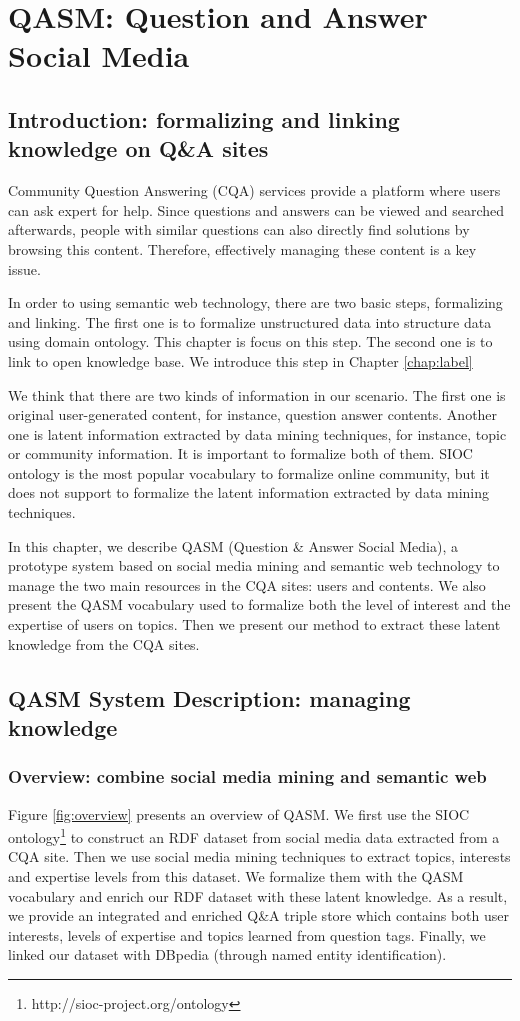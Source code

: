 \chapter{QASM: Question and Answer Social Media}
\doublespacing
\label{chap:qasm}
\minitoc

\section{Introduction: formalizing and linking knowledge on Q\&A sites}
Community Question Answering (CQA) services provide a platform where users can ask expert for help. Since questions and answers can be viewed and searched afterwards, people with similar questions can also directly find solutions by browsing this content. Therefore, effectively managing these content is a key issue. 

In order to using semantic web technology, there are two basic steps, formalizing and linking. The first one is to formalize unstructured data into structure data using domain ontology. This chapter is focus on this step. The second one is to link to open knowledge base. We introduce this step in Chapter \ref{chap:label}

We think that there are two kinds of information in our scenario. The first one is original user-generated content, for instance, question answer contents. Another one is latent information extracted by data mining techniques, for instance, topic or community information. It is important to formalize both of them. SIOC ontology is the most popular vocabulary to formalize online community, but it does not support to formalize the latent information extracted by data mining techniques. 

In this chapter, we describe QASM (Question \& Answer Social Media), a prototype system based on social media mining and semantic web technology to manage the two main resources in the CQA sites: users and contents. We also present the QASM vocabulary used to formalize both the level of interest and the expertise of users on topics. Then we present our method to extract these latent knowledge from the CQA sites. 


\section{QASM System Description: managing knowledge}
\subsection{Overview: combine social media mining and semantic web}
Figure \ref{fig:overview} presents an overview of QASM. We first use the SIOC ontology\footnote{http://sioc-project.org/ontology} to construct an RDF dataset from social media data extracted from a CQA site. Then we use social media mining techniques to extract topics, interests and expertise levels from this dataset. We formalize them with the QASM vocabulary and enrich our RDF dataset with these latent knowledge. As a result, we provide an integrated and enriched Q\&A triple store which contains both user interests, levels of expertise and topics learned from question tags. Finally, we linked our dataset with DBpedia (through named entity identification). 

